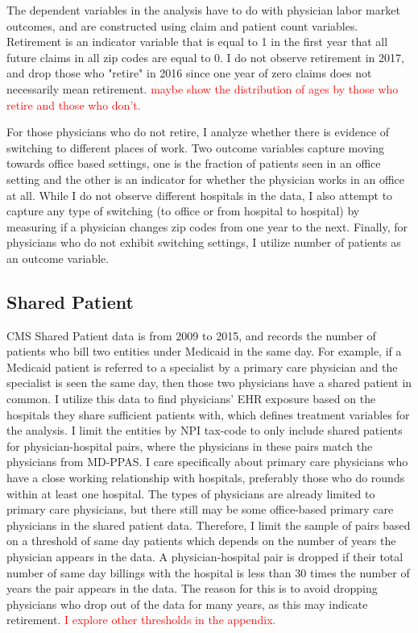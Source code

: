 \documentclass[11pt]{article}
\begin{document}
The dependent variables in the analysis have to do with physician labor market outcomes, and are constructed using claim and patient count variables. Retirement is an indicator variable that is equal to 1 in the first year that all future claims in all zip codes are equal to 0. I do not observe retirement in 2017, and drop those who "retire" in 2016 since one year of zero claims does not necessarily mean retirement. \textcolor{red}{maybe show the distribution of ages by those who retire and those who don't.} 

For those physicians who do not retire, I analyze whether there is evidence of switching to different places of work. Two outcome variables capture moving towards office based settings, one is the fraction of patients seen in an office setting and the other is an indicator for whether the physician works in an office at all. While I do not observe different hospitals in the data, I also attempt to capture any type of switching (to office or from hospital to hospital) by measuring if a physician changes zip codes from one year to the next. Finally, for physicians who do not exhibit switching settings, I utilize number of patients as an outcome variable. 


\subsection{Shared Patient}

CMS Shared Patient data is from 2009 to 2015, and records the number of patients who bill two entities under Medicaid in the same day. For example, if a Medicaid patient is referred to a specialist by a primary care physician and the specialist is seen the same day, then those two physicians have a shared patient in common. I utilize this data to find physicians' EHR exposure based on the hospitals they share sufficient patients with, which defines treatment variables for the analysis. I limit the entities by NPI tax-code to only include shared patients for physician-hospital pairs, where the physicians in these pairs match the physicians from MD-PPAS. I care specifically about primary care physicians who have a close working relationship with hospitals, preferably those who do rounds within at least one hospital. The types of physicians are already limited to primary care physicians, but there still may be some office-based primary care physicians in the shared patient data. Therefore, I limit the sample of pairs based on a threshold of same day patients which depends on the number of years the physician appears in the data. A physician-hospital pair is dropped if their total number of same day billings with the hospital is less than 30 times the number of years the pair appears in the data. The reason for this is to avoid dropping physicians who drop out of the data for many years, as this may indicate retirement. \textcolor{red}{I explore other thresholds in the appendix.} 
\end{document}
